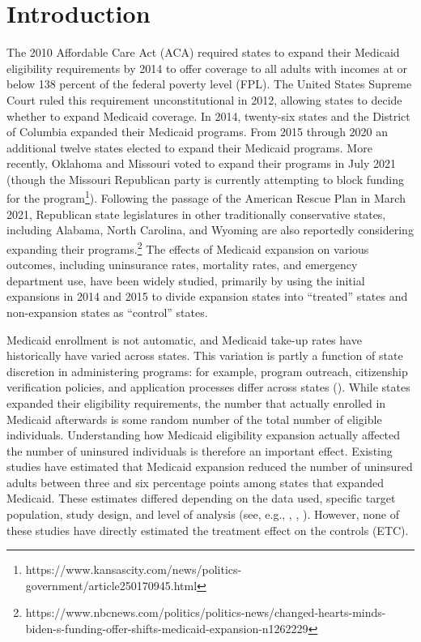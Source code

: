 \documentclass[article]{imsart}
\theoremstyle{plain}
\theoremstyle{remark}
\begin{document}


\section{Introduction}
The 2010 Affordable Care Act (ACA) required states to expand their Medicaid eligibility requirements by 2014 to offer coverage to all adults with incomes at or below 138 percent of the federal poverty level (FPL). The United States Supreme Court ruled this requirement unconstitutional in 2012, allowing states to decide whether to expand Medicaid coverage. In 2014, twenty-six states and the District of Columbia expanded their Medicaid programs. From 2015 through 2020 an additional twelve states elected to expand their Medicaid programs. More recently, Oklahoma and Missouri voted to expand their programs in July 2021 (though the Missouri Republican party is currently attempting to block funding for the program\footnote{https://www.kansascity.com/news/politics-government/article250170945.html}). Following the passage of the American Rescue Plan in March 2021, Republican state legislatures in other traditionally conservative states, including Alabama, North Carolina, and Wyoming are also reportedly considering expanding their programs.\footnote{https://www.nbcnews.com/politics/politics-news/changed-hearts-minds-biden-s-funding-offer-shifts-medicaid-expansion-n1262229} The effects of Medicaid expansion on various outcomes, including uninsurance rates, mortality rates, and emergency department use, have been widely studied, primarily by using the initial expansions in 2014 and 2015 to divide expansion states into ``treated'' states and non-expansion states as ``control'' states. 

Medicaid enrollment is not automatic, and Medicaid take-up rates have historically have varied across states. This variation is partly a function of state discretion in administering programs: for example, program outreach, citizenship verification policies, and application processes differ across states (\cite{courtemanche2017early}). While states expanded their eligibility requirements, the number that actually enrolled in Medicaid afterwards is some random number of the total number of eligible individuals. Understanding how Medicaid eligibility expansion actually affected the number of uninsured individuals is therefore an important effect. Existing studies have estimated that Medicaid expansion reduced the number of uninsured adults between three and six percentage points among states that expanded Medicaid. These estimates differed depending on the data used, specific target population, study design, and level of analysis (see, e.g., \cite{kaestner2017effects}, \cite{courtemanche2017early}, \cite{frean2017premium}). However, none of these studies have directly estimated the treatment effect on the controls (ETC). 
\end{document}
